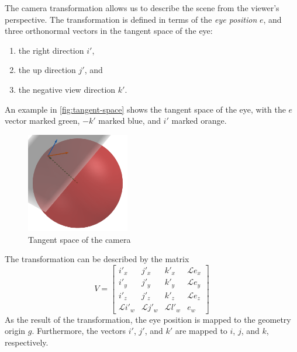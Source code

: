 The camera transformation allows us to describe the scene from the viewer's perspective.
The transformation is defined in terms of the \textit{eye position} $e$, and three orthonormal vectors in the tangent space of the eye:
\begin{enumerate}
    \item the right direction $i'$,
    \item the up direction $j'$, and
    \item the negative view direction $k'$.
\end{enumerate}
An example in \autoref{fig:tangent-space} shows the tangent space of the eye, with the $e$ vector marked green, $-k'$ marked blue, and $i'$ marked orange.\\
\begin{figure}[h]
    \centering
    \includegraphics[width=0.4\textwidth]{chapters/theoretical_foundations/sections/non-eudlidean-spaces/resources/tangent-space.png}
    \caption{Tangent space of the camera}
    \label{fig:tangent-space}
\end{figure}
The transformation can be described by the matrix
\begin{equation*}
    V =
    \begin{bmatrix}
        i'_x            & j'_x            & k'_x            & \mathcal{L}e_x \\
        i'_y            & j'_y            & k'_y            & \mathcal{L}e_y \\
        i'_z            & j'_z            & k'_z            & \mathcal{L}e_z \\
        \mathcal{L}i'_w & \mathcal{L}j'_w & \mathcal{L}l'_w & e_w
    \end{bmatrix}
\end{equation*}
As the result of the transformation, the eye position is mapped to the geometry origin $g$.
Furthermore, the vectors $i'$, $j'$, and $k'$ are mapped to $i$, $j$, and $k$, respectively.

